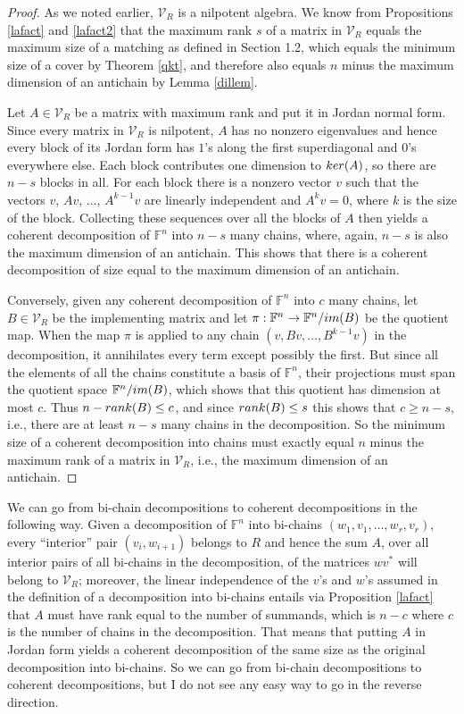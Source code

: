 \documentclass[10pt,a4paper]{amsart}
\begin{document}
\begin{proof}
As we noted earlier, $\mathcal{V}_R$ is a nilpotent algebra. We know from Propositions \ref{lafact} and \ref{lafact2} that the maximum rank $s$ of a matrix in $\mathcal{V}_R$ equals the maximum size of a matching as defined in Section 1.2, which equals the minimum size of a cover by Theorem \ref{qkt}, and therefore also equals $n$ minus the maximum dimension of an antichain by Lemma \ref{dillem}. 

Let $A \in \mathcal{V}_R$ be a matrix with maximum rank and put it in Jordan normal form. Since every matrix in $\mathcal{V}_R$ is nilpotent, $A$ has no nonzero eigenvalues and hence every block of its Jordan form has $1$'s along the first superdiagonal and $0$'s everywhere else. Each block contributes one dimension to ${\rm ker}(A)$, so there are $n - s$ blocks in all. For each block there is a nonzero vector $v$ such that the vectors $v$, $Av$, $\ldots$, $A^{k-1}v$ are linearly independent and $A^k v = 0$, where $k$ is the size of the block. Collecting these sequences over all the blocks of $A$ then yields a coherent decomposition of $\mathbb{F}^n$ into $n - s$ many chains, where, again, $n - s$ is also the maximum dimension of an antichain. This shows that there is a coherent decomposition of size equal to the maximum dimension of an antichain.

Conversely, given any coherent decomposition of $\mathbb{F}^n$ into $c$ many chains, let $B \in \mathcal{V}_R$ be the implementing matrix and let $\pi: \mathbb{F}^n \to \mathbb{F}^n/{\rm im}(B)$ be the quotient map. When the map $\pi$ is applied to any chain $(v, Bv, \ldots, B^{k-1}v)$ in the decomposition, it annihilates every term except possibly the first. But since all the elements of all the chains constitute a basis of $\mathbb{F}^n$, their projections must span the quotient space $\mathbb{F}^n/{\rm im}(B)$, which shows that this quotient has dimension at most $c$. Thus $n - {\rm rank}(B) \leq c$, and since ${\rm rank}(B) \leq s$ this shows that $c \geq n - s$, i.e., there are at least $n - s$ many chains in the decomposition. So the minimum size of a coherent decomposition into chains must exactly equal $n$ minus the maximum rank of a matrix in $\mathcal{V}_R$, i.e., the maximum dimension of an antichain.
\end{proof}

We can go from bi-chain decompositions to coherent decompositions in the following way. Given a decomposition of $\mathbb{F}^n$ into bi-chains $(w_1, v_1, \ldots, w_r, v_r)$, every ``interior'' pair $(v_i, w_{i+1})$ belongs to $R$ and hence the sum $A$, over all interior pairs of all bi-chains in the decomposition, of the matrices $wv^*$ will belong to $\mathcal{V}_R$; moreover, the linear independence of the $v$'s and $w$'s assumed in the definition of a decomposition into bi-chains entails via Proposition \ref{lafact} that $A$ must have rank equal to the number of summands, which is $n - c$ where $c$ is the number of chains in the decomposition. That means that putting $A$ in Jordan form yields a coherent decomposition of the same size as the original decomposition into bi-chains. So we can go from bi-chain decompositions to coherent decompositions, but I do not see any easy way to go in the reverse direction.
\end{document}
